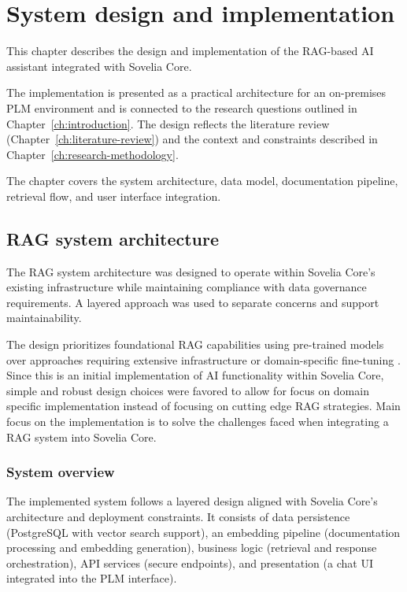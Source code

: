 \chapter{System design and implementation}
\label{ch:system-design-and-implementation}

This chapter describes the design and implementation of the RAG-based AI assistant integrated with Sovelia Core.

The implementation is presented as a practical architecture for an on-premises PLM environment and is connected to the research questions outlined in Chapter~\ref{ch:introduction}. The design reflects the literature review (Chapter~\ref{ch:literature-review}) and the context and constraints described in Chapter~\ref{ch:research-methodology}.

The chapter covers the system architecture, data model, documentation pipeline, retrieval flow, and user interface integration.

\section{RAG system architecture}
\label{sec:rag-system-architecture}

The RAG system architecture was designed to operate within Sovelia Core's existing infrastructure while maintaining compliance with data governance requirements. A layered approach was used to separate concerns and support maintainability.

The design prioritizes foundational RAG capabilities using pre-trained models over approaches requiring extensive infrastructure or domain-specific fine-tuning \parencite{herediaalvaroAdvancedRetrievalaugmentedGeneration2025, shejutiExtendedAbstractEnhancing2025}. Since this is an initial implementation of AI functionality within Sovelia Core, simple and robust design choices were favored to allow for focus on domain specific implementation instead of focusing on cutting edge RAG strategies. Main focus on the implementation is to solve the challenges faced when integrating a RAG system into Sovelia Core.

\subsection{System overview}
\label{subsec:system-overview}

The implemented system follows a layered design aligned with Sovelia Core's architecture and deployment constraints. It consists of data persistence (PostgreSQL with vector search support), an embedding pipeline (documentation processing and embedding generation), business logic (retrieval and response orchestration), API services (secure endpoints), and presentation (a chat UI integrated into the PLM interface).

